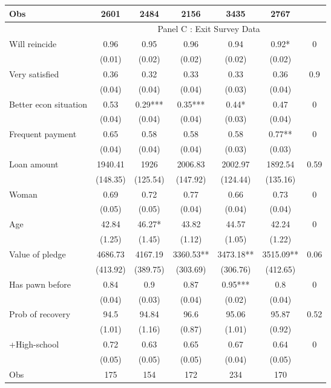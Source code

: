 \begin{tabular}{lcccccc}
Obs   & 2601  & 2484  & 2156  & 3435  & 2767  &  \\
\midrule
\midrule
      & \multicolumn{6}{c}{Panel C : Exit Survey Data} \\
\midrule
\midrule
Will reincide & 0.96  & 0.95  & 0.96  & 0.94  & 0.92* & 0 \\
      & (0.01) & (0.02) & (0.02) & (0.02) & (0.02) &  \\
Very satisfied & 0.36  & 0.32  & 0.33  & 0.33  & 0.36  & 0.9 \\
      & (0.04) & (0.04) & (0.04) & (0.03) & (0.04) &  \\
Better econ situation & 0.53  & 0.29*** & 0.35*** & 0.44* & 0.47  & 0 \\
      & (0.04) & (0.04) & (0.04) & (0.03) & (0.04) &  \\
Frequent payment & 0.65  & 0.58  & 0.58  & 0.58  & 0.77** & 0 \\
      & (0.04) & (0.04) & (0.04) & (0.03) & (0.03) &  \\
Loan amount  & 1940.41 & 1926  & 2006.83 & 2002.97 & 1892.54 & 0.59 \\
      & (148.35) & (125.54) & (147.92) & (124.44) & (135.16) &  \\
Woman & 0.69  & 0.72  & 0.77  & 0.66  & 0.73  & 0 \\
      & (0.05) & (0.05) & (0.04) & (0.04) & (0.04) &  \\
Age   & 42.84 & 46.27* & 43.82 & 44.57 & 42.24 & 0 \\
      & (1.25) & (1.45) & (1.12) & (1.05) & (1.22) &  \\
Value of pledge  & 4686.73 & 4167.19 & 3360.53** & 3473.18** & 3515.09** & 0.06 \\
      & (413.92) & (389.75) & (303.69) & (306.76) & (412.65) &  \\
Has pawn before & 0.84  & 0.9   & 0.87  & 0.95*** & 0.8   & 0 \\
      & (0.04) & (0.03) & (0.04) & (0.02) & (0.04) &  \\
Prob of recovery & 94.5  & 94.84 & 96.6  & 95.06 & 95.87 & 0.52 \\
      & (1.01) & (1.16) & (0.87) & (1.01) & (0.92) &  \\
+High-school & 0.72  & 0.63  & 0.65  & 0.67  & 0.64  & 0 \\
      & (0.05) & (0.05) & (0.05) & (0.04) & (0.05) &  \\
Obs   & 175   & 154   & 172   & 234   & 170   &  \\
\bottomrule
\bottomrule
\end{tabular}%
